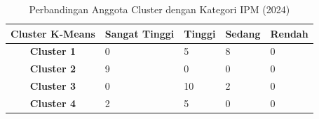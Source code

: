 \begin{table}[H]
\centering
\caption{Perbandingan Anggota Cluster dengan Kategori IPM (2024)} \label{tab:ipm_cross_2024}
\begin{tabular}{|c|p{2cm}|p{2cm}|p{2cm}|p{2cm}|}
\hline
\textbf{Cluster K-Means} & \textbf{Sangat Tinggi} & \textbf{Tinggi} & \textbf{Sedang} & \textbf{Rendah} \\ \hline
\textbf{Cluster 1} & 0 & 5 & 8 & 0 \\ \hline
\textbf{Cluster 2} & 9 & 0 & 0 & 0 \\ \hline
\textbf{Cluster 3} & 0 & 10 & 2 & 0 \\ \hline
\textbf{Cluster 4} & 2 & 5 & 0 & 0 \\ \hline
\end{tabular}
\end{table}